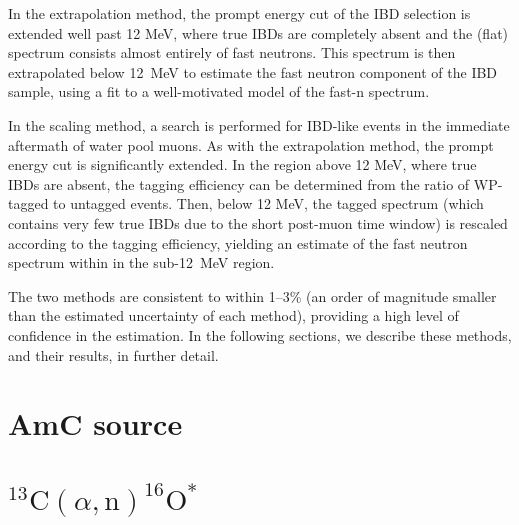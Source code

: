 \documentclass[../thesis.tex]{subfiles}
\begin{document}
In the extrapolation method, the prompt energy cut of the IBD selection is extended well past 12 MeV, where true IBDs are completely absent and the (flat) spectrum consists almost entirely of fast neutrons. This spectrum is then extrapolated below 12~MeV to estimate the fast neutron component of the IBD sample, using a fit to a well-motivated model of the fast-n spectrum.

In the scaling method, a search is performed for IBD-like events in the immediate aftermath of water pool muons. As with the extrapolation method, the prompt energy cut is significantly extended. In the region above 12 MeV, where true IBDs are absent, the tagging efficiency can be determined from the ratio of WP-tagged to untagged events. Then, below 12 MeV, the tagged spectrum (which contains very few true IBDs due to the short post-muon time window) is rescaled according to the tagging efficiency, yielding an estimate of the fast neutron spectrum within in the sub-12~MeV region.

The two methods are consistent to within 1--3\% (an order of magnitude smaller than the estimated uncertainty of each method), providing a high level of confidence in the estimation. In the following sections, we describe these methods, and their results, in further detail.

\section{AmC source}

\section{$^{13}\mathrm{C}(\alpha, \mathrm{n})^{16}\mathrm{O}^*$}
\end{document}
